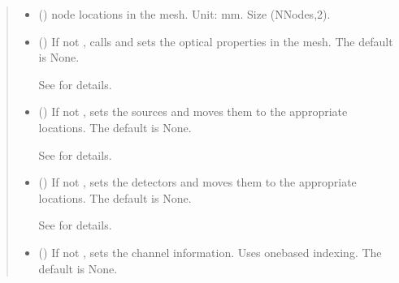 \documentclass[letterpaper,10pt,english]{sphinxmanual}
\begin{document}
\begin{fulllineitems}
\begin{fulllineitems}
\begin{quote}
\begin{description}
\begin{itemize}
\item {} 
\sphinxAtStartPar
{} () \textendash{} node locations in the mesh. Unit: mm. Size (NNodes,2).

\item {} 
\sphinxAtStartPar
{} (\sphinxstyleliteralemphasis{\sphinxupquote{, }}) \textendash{} 
\sphinxAtStartPar
If not , calls  and sets the optical properties in the mesh. The default is None.

\sphinxAtStartPar
See {\hyperref[\detokenize{_autosummary/nirfasterff.base.stnd_mesh.stndmesh:nirfasterff.base.stnd_mesh.stndmesh.set_prop}]{}} for details.


\item {} 
\sphinxAtStartPar
{} (\sphinxstyleliteralemphasis{\sphinxupquote{, }}) \textendash{} 
\sphinxAtStartPar
If not , sets the sources and moves them to the appropriate locations. The default is None.

\sphinxAtStartPar
See {\hyperref[\detokenize{_autosummary/nirfasterff.base.optodes.optode:nirfasterff.base.optodes.optode.touch_sources}]{}} for details.


\item {} 
\sphinxAtStartPar
{} (\sphinxstyleliteralemphasis{\sphinxupquote{, }}) \textendash{} 
\sphinxAtStartPar
If not , sets the detectors and moves them to the appropriate locations. The default is None.

\sphinxAtStartPar
See {\hyperref[\detokenize{_autosummary/nirfasterff.base.optodes.optode:nirfasterff.base.optodes.optode.touch_detectors}]{}} for details.


\item {} 
\sphinxAtStartPar
{} (\sphinxstyleliteralemphasis{\sphinxupquote{, }}) \textendash{} 
\sphinxAtStartPar
If not , sets the channel information. Uses one\sphinxhyphen{}based indexing. The default is None.


\end{itemize}
\end{description}
\end{quote}
\end{fulllineitems}
\end{fulllineitems}
\end{document}
